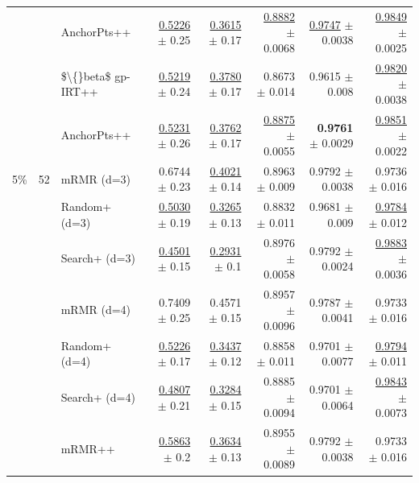 \begin{longtable}{llp{}rrrrr}
 &  & AnchorPts++ & \underline{0.5226} {\scriptsize $\pm$ 0.25} & \underline{0.3615} {\scriptsize $\pm$ 0.17} & \underline{0.8882} {\scriptsize $\pm$ 0.0068} & \underline{0.9747} {\scriptsize $\pm$ 0.0038} & \underline{0.9849} {\scriptsize $\pm$ 0.0025} \\
 &  & \$\textbackslash\{\}beta\$ gp-IRT++ & \underline{0.5219} {\scriptsize $\pm$ 0.24} & \underline{0.3780} {\scriptsize $\pm$ 0.17} & 0.8673 {\scriptsize $\pm$ 0.014} & 0.9615 {\scriptsize $\pm$ 0.008} & \underline{0.9820} {\scriptsize $\pm$ 0.0038} \\
 &  & AnchorPts++ & \underline{0.5231} {\scriptsize $\pm$ 0.26} & \underline{0.3762} {\scriptsize $\pm$ 0.17} & \underline{0.8875} {\scriptsize $\pm$ 0.0055} & \textbf{0.9761} {\scriptsize $\pm$ 0.0029} & \underline{0.9851} {\scriptsize $\pm$ 0.0022} \\
\midrule
5\% & 52 & mRMR (d=3) & 0.6744 {\scriptsize $\pm$ 0.23} & \underline{0.4021} {\scriptsize $\pm$ 0.14} & 0.8963 {\scriptsize $\pm$ 0.009} & 0.9792 {\scriptsize $\pm$ 0.0038} & 0.9736 {\scriptsize $\pm$ 0.016} \\
 &  & Random+ (d=3) & \underline{0.5030} {\scriptsize $\pm$ 0.19} & \underline{0.3265} {\scriptsize $\pm$ 0.13} & 0.8832 {\scriptsize $\pm$ 0.011} & 0.9681 {\scriptsize $\pm$ 0.009} & \underline{0.9784} {\scriptsize $\pm$ 0.012} \\
 &  & Search+ (d=3) & \underline{0.4501} {\scriptsize $\pm$ 0.15} & \underline{0.2931} {\scriptsize $\pm$ 0.1} & 0.8976 {\scriptsize $\pm$ 0.0058} & 0.9792 {\scriptsize $\pm$ 0.0024} & \underline{0.9883} {\scriptsize $\pm$ 0.0036} \\
 &  & mRMR (d=4) & 0.7409 {\scriptsize $\pm$ 0.25} & 0.4571 {\scriptsize $\pm$ 0.15} & 0.8957 {\scriptsize $\pm$ 0.0096} & 0.9787 {\scriptsize $\pm$ 0.0041} & 0.9733 {\scriptsize $\pm$ 0.016} \\
 &  & Random+ (d=4) & \underline{0.5226} {\scriptsize $\pm$ 0.17} & \underline{0.3437} {\scriptsize $\pm$ 0.12} & 0.8858 {\scriptsize $\pm$ 0.011} & 0.9701 {\scriptsize $\pm$ 0.0077} & \underline{0.9794} {\scriptsize $\pm$ 0.011} \\
 &  & Search+ (d=4) & \underline{0.4807} {\scriptsize $\pm$ 0.21} & \underline{0.3284} {\scriptsize $\pm$ 0.15} & 0.8885 {\scriptsize $\pm$ 0.0094} & 0.9701 {\scriptsize $\pm$ 0.0064} & \underline{0.9843} {\scriptsize $\pm$ 0.0073} \\
 &  & mRMR++ & \underline{0.5863} {\scriptsize $\pm$ 0.2} & \underline{0.3634} {\scriptsize $\pm$ 0.13} & 0.8955 {\scriptsize $\pm$ 0.0089} & 0.9792 {\scriptsize $\pm$ 0.0038} & 0.9733 {\scriptsize $\pm$ 0.016} \\

\end{longtable}
